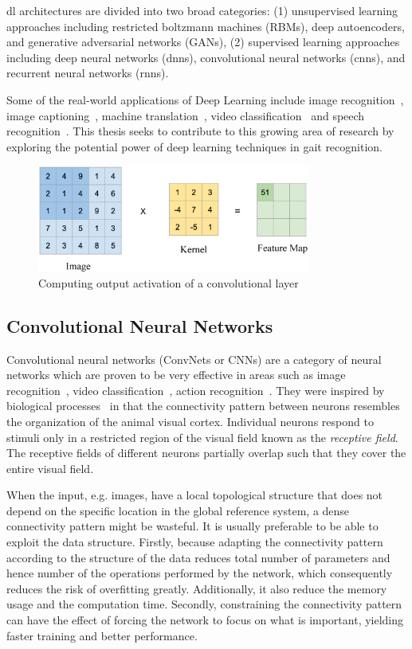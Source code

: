 \gls{dl} architectures are divided into two broad categories: (1) unsupervised learning approaches including restricted boltzmann machines (RBMs), deep autoencoders, and generative adversarial networks (GANs), (2) supervised learning approaches including deep neural networks (\gls{dnn}s), convolutional neural networks (\gls{cnn}s), and recurrent neural networks (\gls{rnn}s).

Some of the real-world applications of Deep Learning include image recognition~\cite{Krizhevsky_12}, image captioning~\cite{Mao_15}, machine translation~\cite{kal_13}, video classification~\cite{karpathy_14} and speech recognition~\cite{graves_13}. This thesis seeks to contribute to this growing area of research by exploring the potential power of deep learning techniques in gait recognition. 


\begin{figure}
	\centering
	\includegraphics[width=0.8\textwidth]{figures/convolution.eps}
	\caption[Computing output activation of a convolutional layer]
	{Computing output activation of a convolutional layer \label{fig:convolution}}
\end{figure}


\subsection{Convolutional Neural Networks}
Convolutional neural networks (ConvNets or CNNs) are a category of neural networks which are proven to be very effective in areas such as image recognition~\cite{Krizhevsky_12}, video classification~\cite{karpathy_14}, action recognition~\cite{Tran_15}. They were inspired by biological processes~\cite{Hubel_68} in that the connectivity pattern between neurons resembles the organization of the animal visual cortex. Individual neurons respond to stimuli only in a restricted region of the visual field known as the \textit{receptive field}. The receptive fields of different neurons partially overlap such that they cover the entire visual field. 

When the input, e.g. images, have a local topological structure that does not depend on the specific location in the global reference system, a dense connectivity pattern might be wasteful. It is usually preferable to be able to exploit the data structure. Firstly, because adapting the connectivity pattern according to the structure of the data reduces total number of parameters and hence number of the  operations performed by the network, which consequently reduces the risk of overfitting greatly. Additionally, it also reduce the memory usage and the computation time. Secondly, constraining the connectivity pattern can have the effect of forcing the network to focus on what is important, yielding faster training and better performance.

